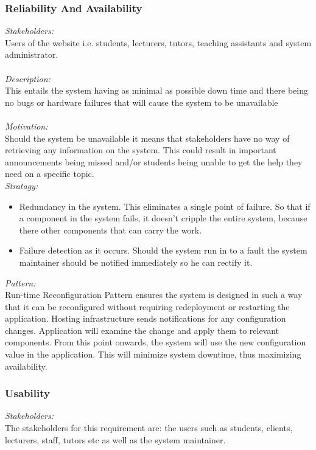 \documentclass[a4paper,12pt]{report}
\begin{document}
		\subsubsection{Reliability And Availability}
		\emph{Stakeholders: }\\ Users of the website i.e. students, lecturers, tutors, teaching assistants and system administrator. \\
		\\\emph{Description: }\\ This entails the system having as minimal as possible down time and there being no bugs or hardware failures that will cause the system to be unavailable \\
		\\\emph{Motivation: }\\ Should the system be unavailable it means that stakeholders have no way of retrieving any information on the system. This could result in important announcements being missed and/or students being unable to get the help they need on a specific topic. \\
		
		\emph{Stratagy: }\\
		\begin{itemize}
		\item Redundancy in the system. This eliminates a single point of failure. So that if a component in the system fails, it doesn’t cripple the entire system, because there other components that can carry the work.
		
		\item Failure detection as it occurs. Should the system run in to a fault the system maintainer should be notified immediately so he can rectify it. 
		\end{itemize}
		
		\emph{Pattern: }\\ Run-time Reconfiguration Pattern ensures the system is designed in such a way that it can be reconfigured without requiring redeployment or restarting the application. Hosting infrastructure sends notifications for any configuration changes. Application will examine the change and apply them to relevant components. From this point onwards, the system will use the new configuration value in the application. This will minimize system downtime, thus maximizing availability.
		
		\subsubsection{Usability}
		\emph{Stakeholders: }\\ The stakeholders for this requirement are: the users such as students, clients, lecturers, staff, tutors etc as well as the system maintainer.\\
		
\end{document}
